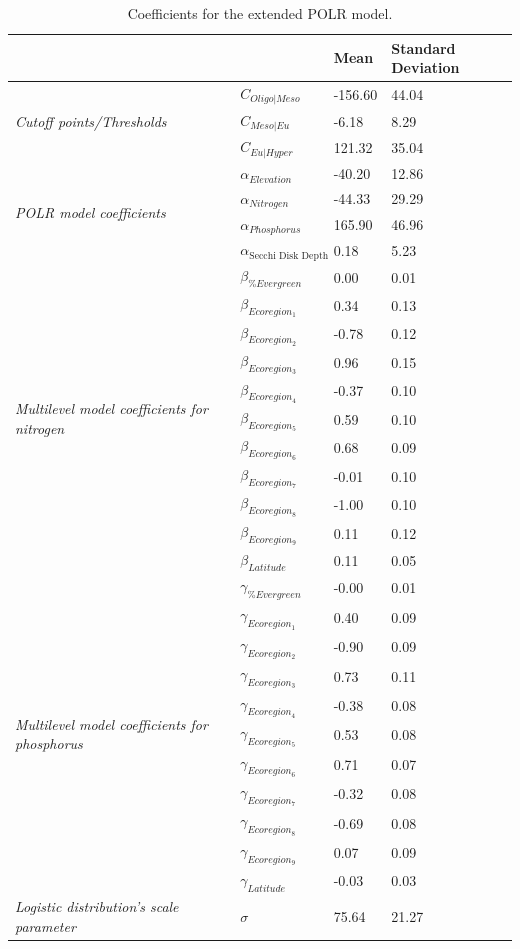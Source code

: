 \documentclass[fleqn,10pt,lineno]{wlpeerj} %
\begin{document}
\begin{table}[ht]
\caption {Coefficients for the extended POLR model.}
\label{tab:MultiPOLRCoeff}
\centering
 \begin{tabular}{llll}
  \hline
  &  & Mean & Standard Deviation\\ 
  \hline
  \multirow{3}{*}{\emph{Cutoff points/Thresholds}} & $C_{Oligo|Meso}$  & -156.60 & 44.04\\ 
  & $C_{Meso|Eu}$  & -6.18 & 8.29\\ 
  & $C_{Eu|Hyper}$ & 121.32 & 35.04\\ 
  \multirow{4}{*}{\emph{POLR model coefficients}}& $\alpha_{Elevation}$ & -40.20 & 12.86\\ 
  & $\alpha_{Nitrogen}$ & -44.33 & 29.29\\ 
  & $\alpha_{Phosphorus}$ & 165.90 & 46.96\\ 
  & $\alpha_{\text{Secchi Disk Depth}}$ & 0.18 & 5.23\\ 
  \multirow{11}{*}{\emph{Multilevel model coefficients for nitrogen}}& $\beta_{\%Evergreen}$ & 0.00 & 0.01\\ 
  & $\beta_{Ecoregion_1}$ & 0.34 & 0.13\\ 
  & $\beta_{Ecoregion_2}$ & -0.78 & 0.12\\ 
  & $\beta_{Ecoregion_3}$ & 0.96 & 0.15\\ 
  & $\beta_{Ecoregion_4}$ & -0.37 & 0.10\\ 
  & $\beta_{Ecoregion_5}$ & 0.59 & 0.10\\ 
  & $\beta_{Ecoregion_6}$ & 0.68 & 0.09\\ 
  & $\beta_{Ecoregion_7}$ & -0.01 & 0.10\\ 
  & $\beta_{Ecoregion_8}$ & -1.00 & 0.10\\ 
  & $\beta_{Ecoregion_9}$ & 0.11 & 0.12\\ 
  & $\beta_{Latitude}$ & 0.11 & 0.05\\ 
  \multirow{11}{*}{\emph{Multilevel model coefficients for phosphorus}}& $\gamma_{\%Evergreen}$ & -0.00 & 0.01\\ 
  & $\gamma_{Ecoregion_1}$ & 0.40 & 0.09\\ 
  & $\gamma_{Ecoregion_2}$ & -0.90 & 0.09\\ 
  & $\gamma_{Ecoregion_3}$ & 0.73 & 0.11\\ 
  & $\gamma_{Ecoregion_4}$ & -0.38 & 0.08\\ 
  & $\gamma_{Ecoregion_5}$ & 0.53 & 0.08\\ 
  & $\gamma_{Ecoregion_6}$ & 0.71 & 0.07\\ 
  & $\gamma_{Ecoregion_7}$ & -0.32 & 0.08\\ 
  & $\gamma_{Ecoregion_8}$ & -0.69 & 0.08\\ 
  & $\gamma_{Ecoregion_9}$ & 0.07 & 0.09\\ 
  & $\gamma_{Latitude}$ & -0.03 & 0.03\\ 
 {\emph{Logistic distribution's scale parameter}}& $\sigma$ & 75.64 & 21.27\\ 
  \hline
\end{tabular}
\end{table}
\end{document}
